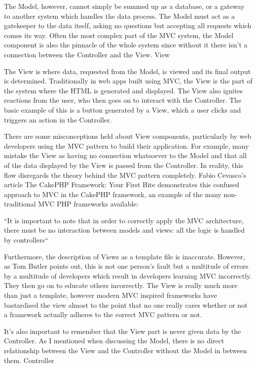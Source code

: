 \documentclass[a4paper,openany,twoside,draft]{book}
\begin{document}
The Model, however, cannot simply be summed up as a database, or a gateway to another system which handles the data process. The Model must act as a gatekeeper to the data itself, asking no questions but accepting all requests which comes its way. Often the most complex part of the MVC system, the Model component is also the pinnacle of the whole system since without it there isn’t a connection between the Controller and the View.
View

The View is where data, requested from the Model, is viewed and its final output is determined. Traditionally in web apps built using MVC, the View is the part of the system where the HTML is generated and displayed. The View also ignites reactions from the user, who then goes on to interact with the Controller. The basic example of this is a button generated by a View, which a user clicks and triggers an action in the Controller.

There are some misconceptions held about View components, particularly by web developers using the MVC pattern to build their application. For example, many mistake the View as having no connection whatsoever to the Model and that all of the data displayed by the View is passed from the Controller. In reality, this flow disregards the theory behind the MVC pattern completely. Fabio Cevasco’s article The CakePHP Framework: Your First Bite demonstrates this confused approach to MVC in the CakePHP framework, an example of the many non-traditional MVC PHP frameworks available:

    “It is important to note that in order to correctly apply the MVC architecture, there must be no interaction between models and views: all the logic is handled by controllers“

Furthermore, the description of Views as a template file is inaccurate. However, as Tom Butler points out, this is not one person’s fault but a multitude of errors by a multitude of developers which result in developers learning MVC incorrectly. They then go on to educate others incorrectly. The View is really much more than just a template, however modern MVC inspired frameworks have bastardised the view almost to the point that no one really cares whether or not a framework actually adheres to the correct MVC pattern or not.

It’s also important to remember that the View part is never given data by the Controller. As I mentioned when discussing the Model, there is no direct relationship between the View and the Controller without the Model in between them.
Controller
\end{document}
